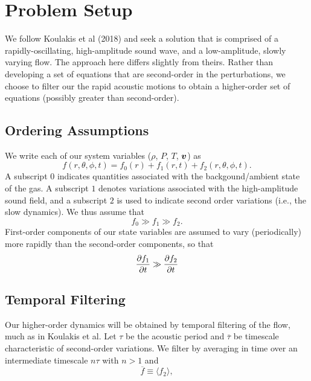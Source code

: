 \section{Problem Setup}
We follow Koulakis et al (2018) and seek a solution that is comprised of a rapidly-oscillating, high-amplitude sound wave, and a low-amplitude, slowly varying flow.   The approach here differs slightly from theirs.  Rather than developing a set of equations that are second-order in the perturbations, we choose to filter our the rapid acoustic motions to obtain a higher-order set of equations (possibly greater than second-order).

\subsection{Ordering Assumptions}

We write each of our system variables ($\rho$, $P$, $T$, $\boldsymbol{v}$) as
\begin{equation}
f(r,\theta,\phi,t) = f_0(r) + f_1(r,t) + f_2(r,\theta,\phi,t).
\end{equation}
A subscript $0$ indicates quantities associated with the backgound/ambient state of the gas.  A subscript $1$ denotes variations associated with the high-amplitude sound field, and a subscript $2$ is used to indicate second order variations (i.e., the slow dynamics).  We thus assume that
\begin{equation}
f_0 \gg f_1 \gg f_2.
\end{equation}
First-order components of our state variables are assumed to vary (periodically) more rapidly than the second-order components, so that
\begin{equation}
\frac{\partial f_1}{\partial t} \gg \frac{\partial f_2}{\partial t}
\end{equation}

\subsection{Temporal Filtering}
Our higher-order dynamics will be obtained by temporal filtering of the flow, much as in Koulakis et al.   Let $\tau$ be the acoustic period and $\overline{\tau}$ be timescale characteristic of second-order variations.   We filter by averaging in time over an intermediate timescale $n\tau$ with $n > 1$ and 
\begin{equation}
\overline{f} \equiv \langle f_2 \rangle,
\end{equation}



